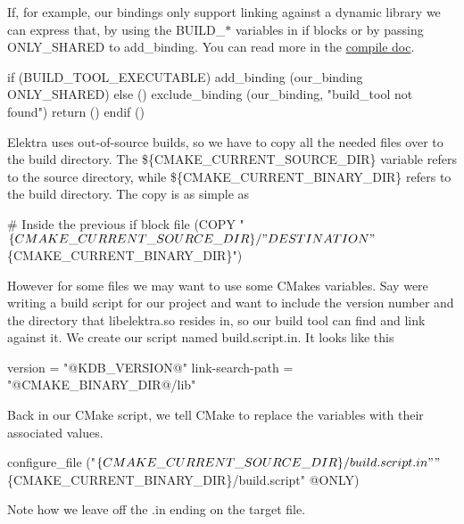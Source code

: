 If, for example, our bindings only support linking against a dynamic library we can express that, by using the {\ttfamily B\+U\+I\+L\+D\+\_\+$\ast$} variables in if blocks or by passing {\ttfamily O\+N\+L\+Y\+\_\+\+S\+H\+A\+R\+ED} to {\ttfamily add\+\_\+binding}. You can read more in the \hyperlink{doc_COMPILE_md}{compile doc}.


\begin{DoxyCode}
if (BUILD\_TOOL\_EXECUTABLE)
    add\_binding (our\_binding ONLY\_SHARED)
else ()
    exclude\_binding (our\_binding, "build\_tool not found")
    return ()
endif ()
\end{DoxyCode}


Elektra uses out-\/of-\/source builds, so we have to copy all the needed files over to the build directory. The \$\{C\+M\+A\+K\+E\+\_\+\+C\+U\+R\+R\+E\+N\+T\+\_\+\+S\+O\+U\+R\+C\+E\+\_\+\+D\+IR\} variable refers to the source directory, while \$\{C\+M\+A\+K\+E\+\_\+\+C\+U\+R\+R\+E\+N\+T\+\_\+\+B\+I\+N\+A\+R\+Y\+\_\+\+D\+IR\} refers to the build directory. The copy is as simple as


\begin{DoxyCode}
# Inside the previous if block
file (COPY "$\{CMAKE\_CURRENT\_SOURCE\_DIR\}/" DESTINATION "$\{CMAKE\_CURRENT\_BINARY\_DIR\}")
\end{DoxyCode}


However for some files we may want to use some C\+Makes variables. Say we\textquotesingle{}re writing a build script for our project and want to include the version number and the directory that {\ttfamily libelektra.\+so} resides in, so our build tool can find and link against it. We create our script named {\ttfamily build.\+script.\+in}. It looks like this


\begin{DoxyCode}
version = "@KDB\_VERSION@"
link-search-path = "@CMAKE\_BINARY\_DIR@/lib"
\end{DoxyCode}


Back in our C\+Make script, we tell C\+Make to replace the variables with their associated values.


\begin{DoxyCode}
configure\_file ("$\{CMAKE\_CURRENT\_SOURCE\_DIR\}/build.script.in" "$\{CMAKE\_CURRENT\_BINARY\_DIR\}/build.script"
       @ONLY)
\end{DoxyCode}


Note how we leave off the {\ttfamily .in} ending on the target file.

